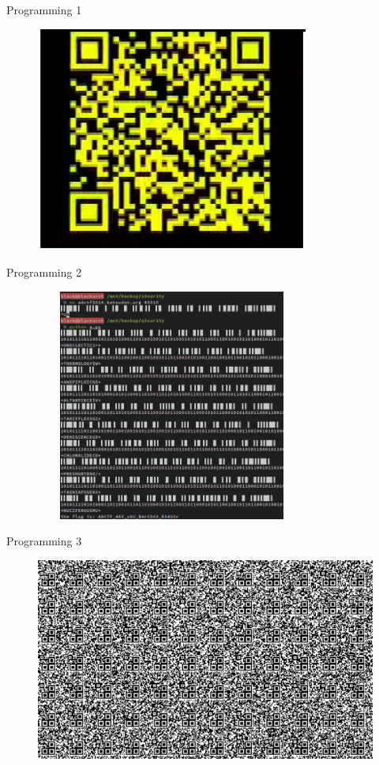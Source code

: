 \documentclass[compress]{beamer}
\begin{document}
\begin{frame}{Programming 1}
	\begin{figure}
		\centering
		\includegraphics[width=0.8\textwidth]{images/p12.png}
	\end{figure}
\end{frame}

\begin{frame}{Programming 2}
	\begin{figure}
		\centering
		\includegraphics[width=0.8\textwidth,height=3in]{images/p21.png}
	\end{figure}
\end{frame}

\begin{frame}{Programming 3}
	\begin{figure}
		\centering
		\includegraphics[width=\textwidth]{images/p31.png}
	\end{figure}
\end{frame}
\end{document}
